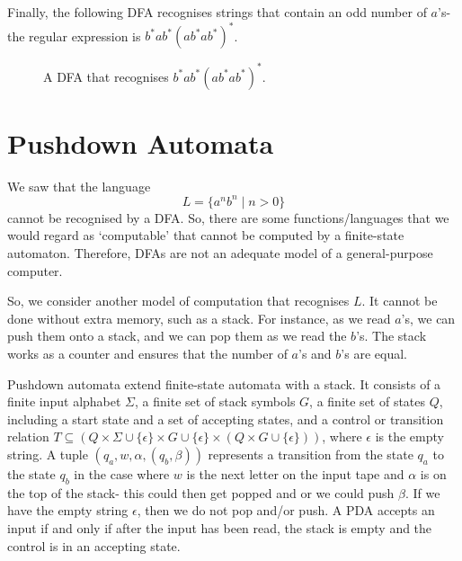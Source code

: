 \documentclass[a4paper, openany]{memoir}
\begin{document}
\noindent Finally, the following DFA recognises strings that contain an odd number of $a$'s- the regular expression is $b^* ab^*(ab^* ab^*)^*$.
\begin{figure}[H]
    \centering
    \caption{A DFA that recognises $b^*a b^*(ab^*ab^*)^*$.}
\end{figure}
\newpage

\section{Pushdown Automata}
We saw that the language
\[L = \{a^n b^n \mid n > 0\}\]
cannot be recognised by a DFA. So, there are some functions/languages that we would regard as `computable' that cannot be computed by a finite-state automaton. Therefore, DFAs are not an adequate model of a general-purpose computer.

So, we consider another model of computation that recognises $L$. It cannot be done without extra memory, such as a stack. For instance, as we read $a$'s, we can push them onto a stack, and we can pop them as we read the $b$'s. The stack works as a counter and ensures that the number of $a$'s and $b$'s are equal.

Pushdown automata extend finite-state automata with a stack. It consists of a finite input alphabet $\Sigma$, a finite set of stack symbols $G$, a finite set of states $Q$, including a start state and a set of accepting states, and a control or transition relation $T \subseteq (Q \times \Sigma \cup \{\epsilon\} \times G \cup \{\epsilon\} \times (Q \times G \cup \{\epsilon\}))$, where $\epsilon$ is the empty string. A tuple $(q_a, w, \alpha, (q_b, \beta))$ represents a transition from the state $q_a$ to the state $q_b$ in the case where $w$ is the next letter on the input tape and $\alpha$ is on the top of the stack- this could then get popped and or we could push $\beta$. If we have the empty string $\epsilon$, then we do not pop and/or push. A PDA accepts an input if and only if after the input has been read, the stack is empty and the control is in an accepting state.
\end{document}
